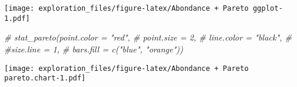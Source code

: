 \documentclass[
]{article}
\newenvironment{Shaded}{\begin{snugshade}}{\end{snugshade}}
\newcommand{\AttributeTok}[1]{\textcolor[rgb]{0.77,0.63,0.00}{#1}}
\newcommand{\CommentTok}[1]{\textcolor[rgb]{0.56,0.35,0.01}{\textit{#1}}}
\newcommand{\DecValTok}[1]{\textcolor[rgb]{0.00,0.00,0.81}{#1}}
\newcommand{\FunctionTok}[1]{\textcolor[rgb]{0.00,0.00,0.00}{#1}}
\newcommand{\NormalTok}[1]{#1}
\newcommand{\OtherTok}[1]{\textcolor[rgb]{0.56,0.35,0.01}{#1}}
\newcommand{\SpecialCharTok}[1]{\textcolor[rgb]{0.00,0.00,0.00}{#1}}
\newcommand{\StringTok}[1]{\textcolor[rgb]{0.31,0.60,0.02}{#1}}
\begin{document}
\texttt{[image: exploration\_files/figure-latex/Abondance + Pareto ggplot-1.pdf]}

\begin{Shaded}
\begin{Highlighting}[]
  \CommentTok{\# stat\_pareto(point.color = "red",}
  \CommentTok{\#             point.size = 2,}
  \CommentTok{\#             line.color = "black",}
  \CommentTok{\#             \#size.line = 1,}
  \CommentTok{\#             bars.fill = c("blue", "orange"))}
\end{Highlighting}
\end{Shaded}

\begin{Shaded}
\end{Shaded}

\texttt{[image: exploration\_files/figure-latex/Abondance + Pareto pareto.chart-1.pdf]}
\end{document}
